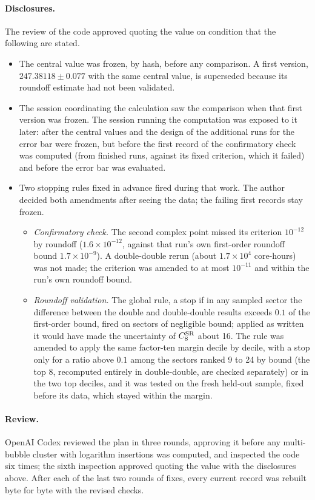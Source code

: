 \documentclass[11pt,a4paper]{article}
\numberwithin{equation}{section}
\newcommand{\CSR}{C^{\rm SR}}
\newcommand{\sci}[2]{#1\times10^{#2}}
\begin{document}
\paragraph{Disclosures.} The review of the code approved quoting the value on condition that the following are stated.
\begin{itemize}
\item The central value was frozen, by hash, before any comparison. A first version, $247.38118\pm0.077$ with the same
 central value, is superseded because its roundoff estimate had not been validated.
\item The session coordinating the calculation saw the comparison when that first version was frozen. The session
 running the computation was exposed to it later: after the central values and the design of the additional runs for
 the error bar were frozen, but before the first record of the confirmatory check was computed (from finished runs,
 against its fixed criterion, which it failed) and before the error bar was evaluated.
\item Two stopping rules fixed in advance fired during that work. The author decided both amendments after seeing the
 data; the failing first records stay frozen.
 \begin{itemize}
 \item[A.] \emph{Confirmatory check.} The second complex point missed its criterion $10^{-12}$ by roundoff
  ($\sci{1.6}{-12}$, against that run's own first-order roundoff bound $\sci{1.7}{-9}$). A double-double rerun (about
  $\sci{1.7}{4}$ core-hours) was not made; the criterion was amended to at most $10^{-11}$ and within the run's own
  roundoff bound.
 \item[B.] \emph{Roundoff validation.} The global rule, a stop if in any sampled sector the difference between the
  double and double-double results exceeds $0.1$ of the first-order bound, fired on sectors of negligible bound; applied as written it would
  have made the uncertainty of $\CSR_8$ about 16. The rule was amended to apply the same factor-ten margin decile by
  decile, with a stop only for a ratio above $0.1$ among the sectors ranked 9 to 24 by bound (the top 8, recomputed entirely in
  double-double, are checked separately) or in the two top deciles, and it
  was tested on the fresh held-out sample, fixed before its data, which stayed within the margin.
 \end{itemize}
\end{itemize}

\paragraph{Review.} OpenAI Codex reviewed the plan in three rounds, approving it before any multi-bubble cluster with logarithm insertions
was computed, and
inspected the code six times; the sixth inspection approved quoting the value with the disclosures above. After each
of the last two rounds of fixes, every current record was rebuilt byte for byte with the revised checks.
\end{document}
